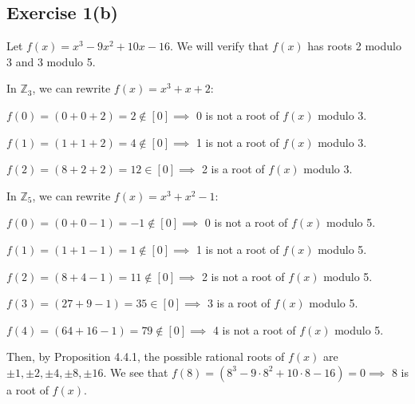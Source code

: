 \subsection*{Exercise 1(b)}
Let $f(x) = x^3 - 9x^2 + 10x - 16$. We will verify that $f(x)$ has roots 2 modulo 3 and 3 modulo 5.

In $\mathbb{Z}_3$, we can rewrite $f(x) = x^3 + x + 2$:

\hspace{10 mm} $f(0) = (0 + 0 + 2) = 2 \not\in [0] \implies$ 0 is not a root of $f(x)$ modulo 3.

\hspace{10 mm} $f(1) = (1 + 1 + 2) = 4 \not\in [0] \implies$ 1 is not a root of $f(x)$ modulo 3.

\hspace{10 mm} $f(2) = (8 + 2 + 2) = 12 \in [0] \implies$ 2 is a root of $f(x)$ modulo 3.

In $\mathbb{Z}_5$, we can rewrite $f(x) = x^3 + x^2 - 1$:

\hspace{10 mm} $f(0) = (0 + 0 - 1) = -1 \not\in [0] \implies$ 0 is not a root of $f(x)$ modulo 5.

\hspace{10 mm} $f(1) = (1 + 1 - 1) = 1 \not\in [0] \implies$ 1 is not a root of $f(x)$ modulo 5.

\hspace{10 mm} $f(2) = (8 + 4 - 1) = 11 \not\in [0] \implies$ 2 is not a root of $f(x)$ modulo 5.

\hspace{10 mm} $f(3) = (27 + 9 - 1) = 35 \in [0] \implies$ 3 is a root of $f(x)$ modulo 5.

\hspace{10 mm} $f(4) = (64 + 16 - 1) = 79 \not\in [0] \implies$ 4 is not a root of $f(x)$ modulo 5.

Then, by Proposition 4.4.1, the possible rational roots of $f(x)$ are $\pm 1, \pm 2, \pm 4, \pm 8, \pm 16$. We see that $f(8) = (8^3 - 9\cdot8^2 + 10\cdot8 - 16) = 0 \implies $ 8 is a root of $f(x)$.